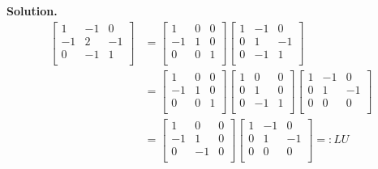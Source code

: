 \documentclass[a4paper]{book}
\newenvironment{solution}%
{\noindent\textbf{Solution.}}%
{\qedhere}
\numberwithin{equation}{chapter}
\theoremstyle{definition}
\begin{document}
\begin{solution}
    \begin{align*}
        \left[ \begin{array}{rrr}
                1  & -1 & 0  \\
                -1 & 2  & -1 \\
                0  & -1 & 1  \\
            \end{array} \right]
         & = \left[ \begin{array}{rrr}
                1  & 0 & 0 \\
                -1 & 1 & 0 \\
                0  & 0 & 1 \\
            \end{array}\right]
        \left[ \begin{array}{rrr}
                1 & -1 & 0  \\
                0 & 1  & -1 \\
                0 & -1 & 1  \\
            \end{array}\right]                                                                \\
         & = \left[ \begin{array}{rrr}
                1  & 0 & 0 \\
                -1 & 1 & 0 \\
                0  & 0 & 1 \\
            \end{array}\right]
        \left[ \begin{array}{rrr}
                1 & 0  & 0 \\
                0 & 1  & 0 \\
                0 & -1 & 1 \\
            \end{array}\right]
        \left[ \begin{array}{rrr}
                1 & -1 & 0  \\
                0 & 1  & -1 \\
                0 & 0  & 0  \\
            \end{array}\right]                                                               \\
         & =   \left[ \begin{array}{rrr}
                1  & 0  & 0 \\
                -1 & 1  & 0 \\
                0  & -1 & 0 \\
            \end{array}\right]\left[ \begin{array}{rrr}
                1 & -1 & 0  \\
                0 & 1  & -1 \\
                0 & 0  & 0  \\
            \end{array}\right] =: \mathit{LU}
    \end{align*}
\end{solution}
\end{document}
